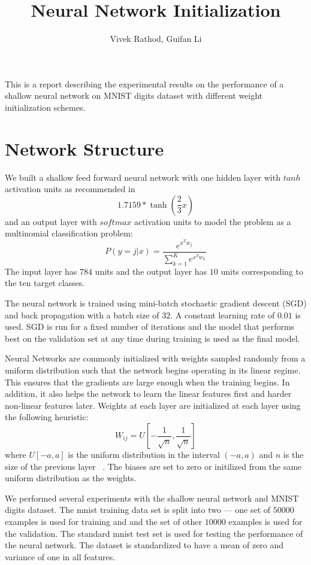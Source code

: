 \documentclass[Proceedings]{ascelike}
\begin{document}
%
\title{Neural Network Initialization}
%
\author{ Vivek Rathod, Guifan Li }
%
\maketitle
%

 This is a report describing the experimental results on the
performance of a shallow neural network on MNIST digits dataset with different
weight initialization schemes.  \section{Network Structure}
\label{sec:network_struct} We built a shallow feed forward neural network with
one hidden layer with $tanh$ activation units as recommended in
\cite{lecun2012efficient} \[1.7159*\tanh\left(\frac{2}{3}x\right)\] and an
output layer with $softmax$ activation units to model the problem as a
multinomial classification
problem:\[P(y=j|x)=\frac{e^{x^{T}w_j}}{\sum_{k=1}^Ke^{x^{T}w_k}}\] The input
layer has $784$ units and the output layer has $10$ units corresponding to the
ten target classes.

 \label{sec:train_method} The neural network is
trained using mini-batch stochastic gradient descent (SGD) and back propagation
with a batch size of $32$. A constant learning rate of $0.01$ is used. SGD is
run for a fixed number of iterations and the model that performs best on the
validation set at any time during training is used as the final model. 

 \label{sec:weight_init} Neural Networks are
commonly initialized with weights sampled randomly from a uniform distribution
such that the network begins operating in its linear regime. This ensures that
the gradients are large enough when the training begins. In addition, it also
helps the network to learn the linear features first and harder non-linear
features later. Weights at each layer are initialized at each layer using the
following heuristic: \[W_{ij} =
U\left[-\frac{1}{\sqrt{n}},\frac{1}{\sqrt{n}}\right]\] where $U[-a, a]$ is the
uniform distribution in the interval $(-a, a)$ and $n$ is the size of the
previous layer ~\cite{erhan2009difficulty}. The biases are set to zero or
initilized from the same uniform distribution as the weights.

 We performed several experiments with the shallow neural
network and MNIST digits dataset. The mnist training data set is split into
two --- one set of $50000$ examples is used for training and and the set of
other $10000$ examples is used for the validation. The standard mnist test set
is used for testing the performance of the neural network. The dataset is
standardized to have a mean of zero and variance of one in all features.
\end{document}
